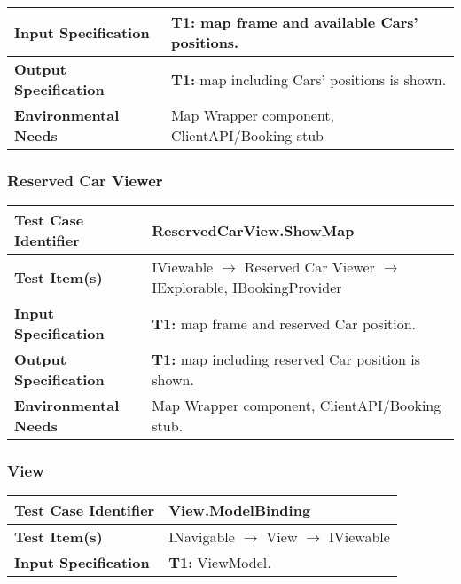 {\begin{tabularx}{\textwidth}{l X}
    \textbf{Input Specification} & \textbf{T1:} map frame and available Cars' positions.\\
    \hline 
    
    \textbf{Output Specification} & \textbf{T1:} map including Cars' positions is shown.\\
    \hline 
    
    \textbf{Environmental Needs} & Map Wrapper component, ClientAPI/Booking stub\\
    \hline
\end{tabularx}

\subsubsection{Reserved Car Viewer}
\noindent
\begin{tabularx}{\textwidth}{l X}
    \hline 
    \textbf{Test Case Identifier} & ReservedCarView.ShowMap\\ 
    \hline 
    
    \textbf{Test Item(s)} &  IViewable $\rightarrow$ Reserved Car Viewer $\rightarrow$ IExplorable, IBookingProvider\\
    \hline 
    
    \textbf{Input Specification} & \textbf{T1:} map frame and reserved Car position.\\
    \hline 
    
    \textbf{Output Specification} & \textbf{T1:} map including reserved Car position is shown.\\
    \hline 
    
    \textbf{Environmental Needs} & Map Wrapper component, ClientAPI/Booking stub.\\
    \hline
\end{tabularx}


\subsubsection{View}
\noindent
\begin{tabularx}{\textwidth}{l X}
    \hline 
    \textbf{Test Case Identifier} & View.ModelBinding\\ 
    \hline 
    
    \textbf{Test Item(s)} & INavigable $\rightarrow$ View $\rightarrow$ IViewable\\
    \hline 
    
    \textbf{Input Specification} & \textbf{T1:} ViewModel.\\
    \hline 
    

\end{tabularx}}
